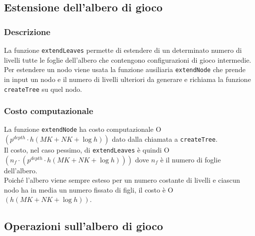 \documentclass[11pt]{article}
\begin{document}
\subsection*{Estensione dell'albero di gioco}
\subsubsection*{Descrizione}
La funzione \texttt{extendLeaves} permette di estendere di un determinato numero di livelli tutte le foglie dell'albero che contengono configurazioni di gioco intermedie.\\
Per estendere un nodo viene usata la funzione ausiliaria \texttt{extendNode} che prende in input un nodo e il numero di livelli ulteriori da generare e richiama la funzione \texttt{createTree} su quel nodo.
\subsubsection*{Costo computazionale}
La funzione \texttt{extendNode} ha costo computazionale O$(p^{depth} \cdot h(MK + NK + \log h))$ dato dalla chiamata a \texttt{createTree}.\\
Il costo, nel caso pessimo, di \texttt{extendLeaves} è quindi O$(n_f\cdot(p^{depth} \cdot h(MK + NK + \log h)))$ dove $n_f$ è il numero di foglie dell'albero.\\
Poiché l'albero viene sempre esteso per un numero costante di livelli e ciascun nodo ha in media un numero fissato di figli, il costo è O$(h(MK+NK+\log h))$.

\subsection*{Operazioni sull'albero di gioco}
\end{document}
